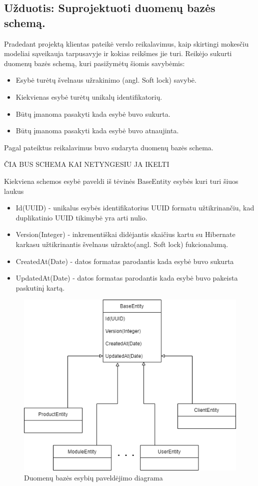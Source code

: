 \documentclass{VUMIFPSkursinis}
\begin{document}
	\subsection{Užduotis: Suprojektuoti duomenų bazės schemą.}
		Pradedant projektą klientas pateikė verslo reikalavimus, kaip skirtingi mokesčiu modeliai sąveikauja tarpusavyje ir kokias reikšmes jie turi.
		Reikėjo sukurti duomenų bazės schemą, kuri pasižymėtų šiomis savybėmis:
		\begin{itemize}
			\item{Esybė turėtų švelnaus užrakinimo (angl. Soft lock) savybė.}
			\item{Kiekvienas esybė turėtų unikalų identifikatorių.}
			\item{Būtų įmanoma pasakyti kada esybė buvo sukurta.}
			\item{Būtų įmanoma pasakyti kada esybė buvo atnaujinta.}
		\end{itemize}

		Pagal pateiktus reikalavimus buvo sudaryta duomenų bazės schema.

		ČIA BUS SCHEMA KAI NETYNGESIU JA IKELTI

		Kiekviena schemos esybė paveldi iš tėvinės BaseEntity esybės kuri turi šiuos laukus
		\begin{itemize}
			\item{Id(UUID) - unikalus esybės identifikatorius UUID formatu užtikrinančiu, kad duplikatinio UUID tikimybė yra arti nulio.}
			\item{Version(Integer) - inkrementiškai didėjantis skaičius kartu su Hibernate karkasu užtikrinantis švelnaus užrakto(angl. Soft lock) fukcionalumą.}
			\item{CreatedAt(Date) - datos formatas parodantis kada esybė buvo sukurta}
			\item{UpdatedAt(Date) - datos formatas parodantis kada esybė buvo pakeista paskutinį kartą.}
		\end{itemize}


		\begin{figure}[H]
			\includegraphics[scale=0.7]{img/eight}
			\caption{Duomenų bazės esybių paveldėjimo diagrama} %
			\label{img:kurimoProcesas}
		\end{figure}
\end{document}
